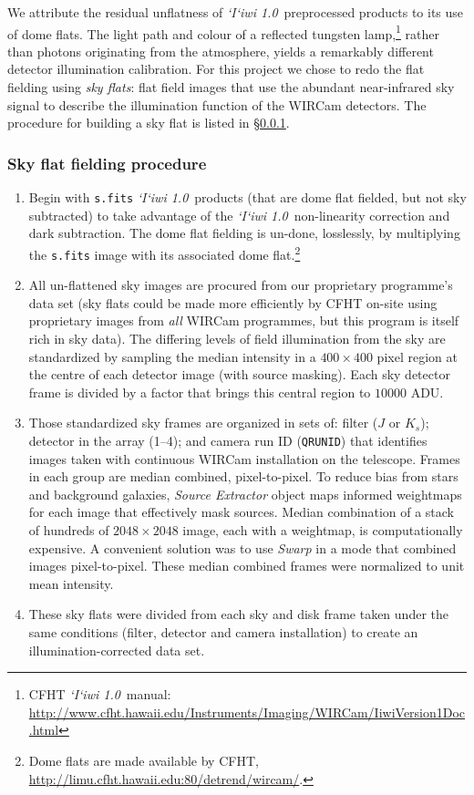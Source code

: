 \documentclass[iop]{emulateapj}
\newcommand{\sw}[1]{\textit{#1}} %
\newcommand{\iiwione}{\sw{`I`iwi 1.0}}
\begin{document}
We attribute the residual unflatness of \iiwione\ preprocessed products to its use of dome flats. The light path and colour of a reflected tungsten lamp,\footnote{CFHT \iiwione\ manual: \url{http://www.cfht.hawaii.edu/Instruments/Imaging/WIRCam/IiwiVersion1Doc.html}} rather than photons originating from the atmosphere, yields a remarkably different detector illumination calibration. For this project we chose to redo the flat fielding using \emph{sky flats}: flat field images that use the abundant near-infrared sky signal to describe the illumination function of the WIRCam detectors. The procedure for building a sky flat is listed in \S\ref{sec:skyflatpro}.

\subsubsection{Sky flat fielding procedure}
\label{sec:skyflatpro}

\begin{enumerate}
	\item Begin with  \texttt{s.fits} \iiwione\ products (that are dome flat fielded, but not sky subtracted) to take advantage of the \iiwione\ non-linearity correction and dark subtraction. The dome flat fielding is un-done, losslessly, by multiplying the \texttt{s.fits} image with its associated dome flat.\footnote{Dome flats are made available by CFHT, \url{http://limu.cfht.hawaii.edu:80/detrend/wircam/}.}
	\item All un-flattened sky images are procured from our proprietary programme's data set (sky flats could be made more efficiently by CFHT on-site using proprietary images from \emph{all} WIRCam programmes, but this program is itself rich in sky data). The differing levels of field illumination from the sky are standardized by sampling the median intensity in a $400\times 400$ pixel region at the centre of each detector image (with source masking). Each sky detector frame is divided by a factor that brings this central region to $10000$ ADU.
	\item Those standardized sky frames are organized in sets of: filter ($J$ or $K_s$); detector in the array (1--4); and camera run ID (\texttt{QRUNID}) that identifies images taken with continuous WIRCam installation on the telescope. Frames in each group are median combined, pixel-to-pixel. To reduce bias from stars and background galaxies, \sw{Source Extractor} object maps informed weightmaps for each image that effectively mask sources. Median combination of a stack of hundreds of $2048\times2048$ image, each with a weightmap, is computationally expensive. A convenient solution was to use \sw{Swarp} \citep[an image-mosaicing software package,][]{Bertin:2002} in a mode that combined images pixel-to-pixel. These median combined frames were normalized to unit mean intensity.
	\item These sky flats were divided from each sky and disk frame taken under the same conditions (filter, detector and camera installation) to create an illumination-corrected data set.
\end{enumerate}
\end{document}
